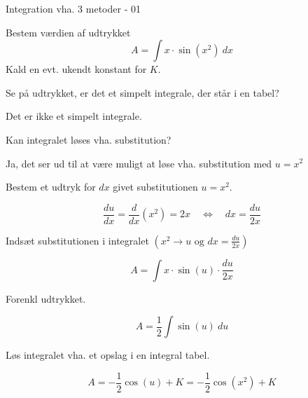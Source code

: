 \documentclass{article}
\begin{document}
\tableofcontents


\begin{exercise}{Integration vha. 3 metoder - 01}

Bestem værdien af udtrykket
\[
A = \int x \cdot \sin(x^2) \ dx
\]
Kald en evt. ukendt konstant for $K$.



\hint
Se på udtrykket, er det et simpelt integrale, der står i en tabel?

\hint
Det er ikke et simpelt integrale.

\hint
Kan integralet løses vha. substitution?

\hint
Ja, det ser ud til at være muligt at løse vha. substitution med $u=x^2$

\hint
Bestem et udtryk for $dx$ givet substitutionen $u=x^2$.

\hint
\[
\frac{du}{dx} = \frac{d}{dx} \left(x^2 \right) = 2x \quad \Leftrightarrow \quad dx = \frac{du}{2x}
\]

\hint
Indsæt substitutionen i integralet $\left(x^2 \rightarrow u \textrm{ og } dx = \frac{du}{2x} \right)$

\hint
\[
A = \int x \cdot \sin(u) \cdot \frac{du}{2x}
\]

\hint
Forenkl udtrykket.

\hint
\[
A= \frac{1}{2} \int \sin(u) \ du
\]

\hint
Løs integralet vha. et opslag i en integral tabel.

\hint
\[
A = - \frac{1}{2} \cos(u) + K = - \frac{1}{2} \cos(x^2) + K
\]


\end{exercise}

\newpage
\end{document}
